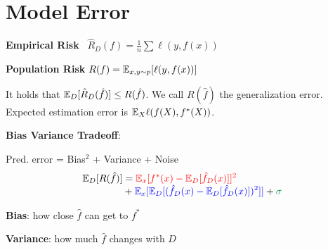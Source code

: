 \section*{Model Error}

\textbf{Empirical Risk} \quad \ $\hat R_D(f) = \frac{1}{n} \sum \mathcal \ell(y, f(x))$

\textbf{Population Risk} \quad $R(f) = \mathbb{E}_{x,y \sim p}[\ell(y, f(x))]$

It holds that $\mathbb{E}_D[\hat R_D (\hat f)] \leq R(\hat f)$. We call $R(\hat f)$ the generalization error. Expected estimation error is $\mathbb{E}_{X}\ell(f(X), f^\ast(X))$.

\textbf{Bias Variance Tradeoff}:

Pred. error = \color{red} Bias$^2$ \color{black} + \color{blue} Variance \color{black} + \color{ForestGreen} Noise \color{black}
\begin{align*}
	\E_D[R(\hat f)] &= \color{red} \E_x[f^*(x) - \E_D[\hat f_D(x)]]^2 \\[-4pt]
 	&+ \color{blue} \E_x[\E_D[(\hat f_D(x) - \E_D[\hat f_D(x)])^2]] \color{black}  + \color{ForestGreen} \sigma
\end{align*}

\textbf{Bias}: how close $\hat f$ can get to $f^*$

\textbf{Variance}: how much $\hat f$ changes with $D$
